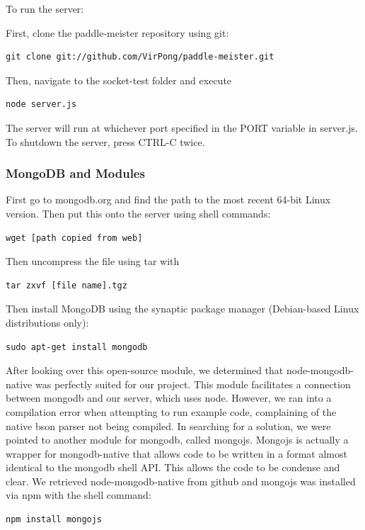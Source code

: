 \documentclass[letterpaper,12pt]{article}
\begin{document}
To run the server:

First, clone the paddle-meister repository using git:

\begin{verbatim}
git clone git://github.com/VirPong/paddle-meister.git
\end{verbatim}

Then, navigate to the socket-test folder and execute

\begin{verbatim}
node server.js
\end{verbatim}

The server will run at whichever port specified in the PORT variable in server.js. To shutdown the server, press CTRL-C twice.

\subsubsection{MongoDB and Modules}
First go to mongodb.org and find the path to the most recent 64-bit Linux version. Then put this onto the server using shell commands:

\begin{verbatim}
wget [path copied from web]
\end{verbatim}
Then uncompress the file using tar with

\begin{verbatim}
tar zxvf [file name].tgz
\end{verbatim}

Then install MongoDB using the synaptic package manager (Debian-based Linux distributions only):
\begin{verbatim}
sudo apt-get install mongodb
\end{verbatim}

After looking over this open-source module, we determined that node-mongodb-native was perfectly suited for our project. This module facilitates a connection between mongodb and our server, which uses node. However, we ran into a compilation error when attempting to run example code, complaining of the native bson parser not being compiled.
In searching for a solution, we were pointed to another module for mongodb, called mongojs. Mongojs is actually a wrapper for mongodb-native that allows code to be written in a format almost identical to the mongodb shell API. This allows the code to be condense and clear.
We retrieved node-mongodb-native from github and mongojs was installed via npm with the shell command:
\begin{verbatim}
npm install mongojs
\end{verbatim}
\end{document}
